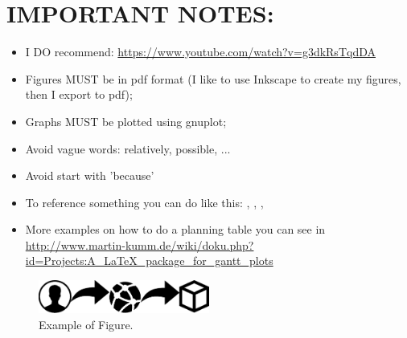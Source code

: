 \newpage
\section*{IMPORTANT NOTES:}
\begin{itemize}
	\item I DO recommend: \url{https://www.youtube.com/watch?v=g3dkRsTqdDA}
	\item Figures MUST be in pdf format (I like to use Inkscape to create my figures, then I export to pdf);
	\item Graphs MUST be plotted using gnuplot; 
	\item Avoid vague words: relatively, possible, ... 
	\item Avoid start with 'because'
	\item To reference something you can do like this: \cite{justyna2015SBRC}, \cite{kerkers2014aims}, \cite{jjsantanna2015IM2,jjsantanna2015IM1}, \cite{santanna2013aims} 
	\item More examples on how to do a planning table you can see in \url{http://www.martin-kumm.de/wiki/doku.php?id=Projects:A_LaTeX_package_for_gantt_plots}
\end{itemize}

\begin{figure}[h!]
	\label{fig:approach}
	\centering
	\includegraphics[width=0.5\textwidth]{figs/example.eps}
	\caption{Example of Figure.}
\end{figure}